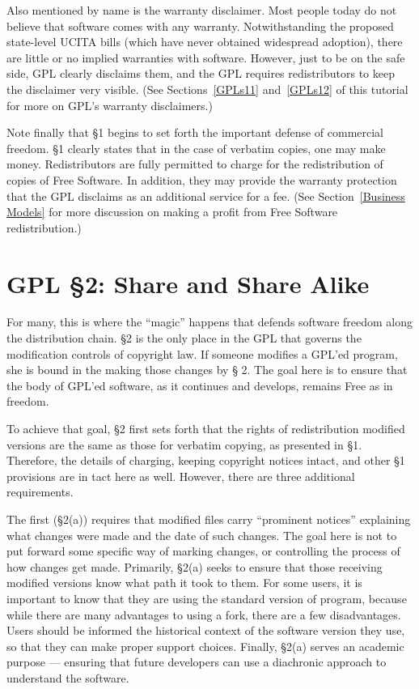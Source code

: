 \documentclass[12pt]{report}
\begin{document}
Also mentioned by name is the warranty disclaimer.  Most people today do
not believe that software comes with any warranty.  Notwithstanding the
proposed state-level UCITA bills (which have never obtained widespread
adoption), there are little or no implied warranties with software.
However, just to be on the safe side, GPL clearly disclaims them, and the
GPL requires redistributors to keep the disclaimer very visible.  (See
Sections~\ref{GPLs11} and~\ref{GPLs12} of this tutorial for more on GPL's
warranty disclaimers.)

Note finally that \S 1 begins to set forth the important defense of
commercial freedom.  \S 1 clearly states that in the case of verbatim
copies, one may make money.  Redistributors are fully permitted to charge
for the redistribution of copies of Free Software.  In addition, they may
provide the warranty protection that the GPL disclaims as an additional
service for a fee.  (See Section~\ref{Business Models} for more discussion
on making a profit from Free Software redistribution.)

\section{GPL \S 2: Share and Share Alike}

For many, this is where the ``magic'' happens that defends software
freedom along the distribution chain.  \S 2 is the only place in the GPL
that governs the modification controls of copyright law.  If someone
modifies a GPL'ed program, she is bound in the making those changes by \S
2.  The goal here is to ensure that the body of GPL'ed software, as it
continues and develops, remains Free as in freedom.

To achieve that goal, \S 2 first sets forth that the rights of
redistribution modified versions are the same as those for verbatim
copying, as presented in \S 1.  Therefore, the details of charging,
keeping copyright notices intact, and other \S 1 provisions are in tact
here as well.  However, there are three additional requirements.

The first (\S 2(a)) requires that modified files carry ``prominent
notices'' explaining what changes were made and the date of such changes.
The goal here is not to put forward some specific way of marking changes,
or controlling the process of how changes get made.  Primarily, \S 2(a)
seeks to ensure that those receiving modified versions know what path it
took to them.  For some users, it is important to know that they are using
the standard version of program, because while there are many advantages
to using a fork, there are a few disadvantages.  Users should be informed
the historical context of the software version they use, so that they can
make proper support choices.  Finally, \S 2(a) serves an academic purpose
--- ensuring that future developers can use a diachronic approach to
understand the software.
\end{document}
